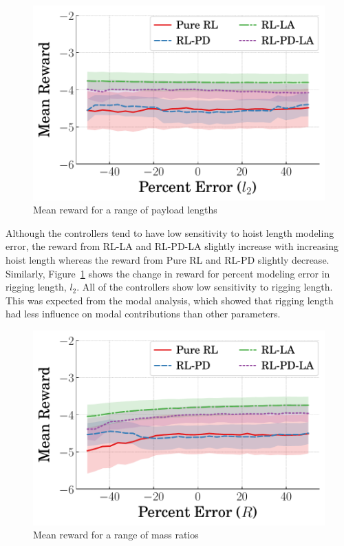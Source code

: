 \begin{figure}[tb]
    \centering
    \includegraphics[width=0.65\columnwidth]{figures/figures_robustness/dpcrane_robustness/L2_robustness.pdf}
    \vspace{-2ex}
    \caption{Mean reward for a range of payload lengths}
    \label{fig:mean_reward_payload_length}
\end{figure}
%
Although the controllers tend to have low sensitivity to hoist length modeling error, the reward from RL-LA and RL-PD-LA slightly increase with increasing hoist length whereas the reward from Pure RL and RL-PD slightly decrease.
%
Similarly, Figure~\ref{fig:mean_reward_payload_length} shows the change in reward for percent modeling error in rigging length, $l_2$.
All of the controllers show low sensitivity to rigging length. This was expected from the modal analysis, which showed that rigging length had less influence on modal contributions than other parameters.
%
\begin{figure}[tb]
    \centering
    \includegraphics[width=0.65\columnwidth]{figures/figures_robustness/dpcrane_robustness/R_robustness.pdf}
    \vspace{-2ex}
    \caption{Mean reward for a range of mass ratios}
    \label{fig:mean_reward_mass_ratio}
\end{figure}
